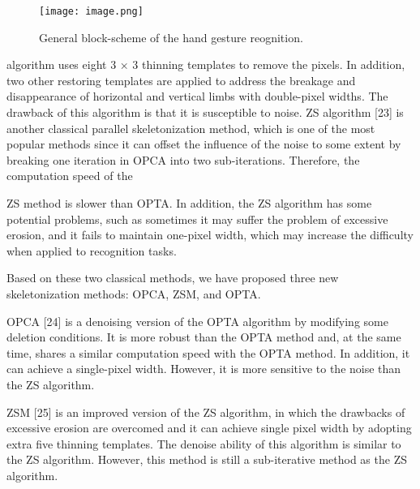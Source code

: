 \documentclass{article}
\begin{document}
\begin{newpage}

\renewcommand{\figurename}{Figure}
\begin{figure}[H]
    \centering
    \texttt{[image: image.png]}
     \caption {General block-scheme of the hand gesture reognition.}
    \label{fig:enter-label}
\end{figure}

\begin{multicols}{2}

\raggedright
\begin{minipage}[t]{0.47\textwidth}

algorithm uses eight 3 × 3 thinning templates to remove the pixels. In addition, two other restoring templates are applied to address the breakage and disappearance of horizontal and vertical limbs with double-pixel widths. The drawback of this algorithm is that it is susceptible to noise. ZS algorithm [23] is another classical parallel skeletonization method, which is one of the most popular methods since it can offset the influence of the noise to some extent by breaking one iteration in OPCA into two sub-iterations. Therefore, the computation speed of the 

\hspace{0.2cm}ZS method is slower than OPTA. In addition, the ZS algorithm has some potential problems, such as sometimes it may suffer the problem of excessive erosion, and it fails to maintain one-pixel width, which may increase the difficulty when applied to recognition tasks. 

\hspace{0.2cm}Based on these two classical methods, we have proposed three new skeletonization methods: OPCA, ZSM, and OPTA. 

\hspace{0.2cm}OPCA [24] is a denoising version of the OPTA algorithm by modifying some deletion conditions. It is more robust than the OPTA method and, at the same time, shares a similar computation speed with the OPTA method. In addition, it can achieve a single-pixel width. However, it is more sensitive to the noise than the ZS algorithm. 

\hspace{0.2cm}ZSM [25] is an improved version of the ZS algorithm, in which the drawbacks of excessive erosion are overcomed and it can achieve single pixel width by adopting extra five thinning templates. The denoise ability of this algorithm is similar to the ZS algorithm. However, this method is still a sub-iterative method as the ZS algorithm.


\end{minipage}
\end{multicols}
\end{newpage}
\end{document}
